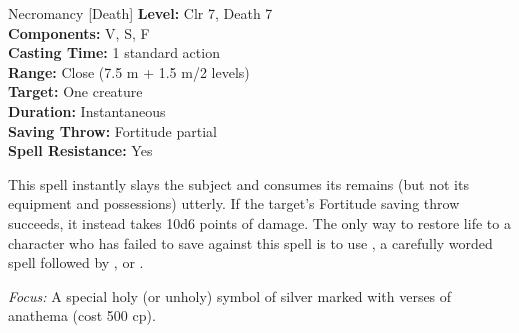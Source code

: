 {Necromancy [Death]}
{
	\textbf{Level:}
	Clr 7, Death 7\\
	\textbf{Components:}
	V, S, F\\
	\textbf{Casting Time:}
	1 standard action\\
	\textbf{Range:}
	Close (7.5 m + 1.5 m/2 levels)\\
	\textbf{Target:}
	One creature\\
	\textbf{Duration:}
	Instantaneous\\
	\textbf{Saving Throw:}
	Fortitude partial\\
	\textbf{Spell Resistance:}
	Yes\\
}
{
	This spell instantly slays the subject and consumes its remains (but not its equipment and possessions) utterly. If the target's Fortitude saving throw succeeds, it instead takes 10d6 points of damage. The only way to restore life to a character who has failed to save against this spell is to use , a carefully worded  spell followed by , or .

	\textit{Focus:}
	A special holy (or unholy) symbol of silver marked with verses of anathema (cost 500 cp).

}
